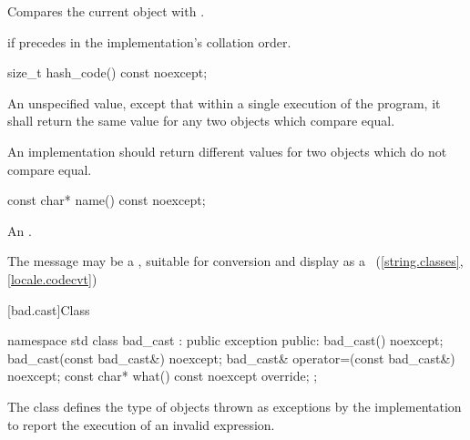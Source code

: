 \begin{itemdescr}
\pnum
\effects
Compares the current object with .

\pnum
\returns
{}
if
precedes  in the implementation's collation order.
\end{itemdescr}

%
\begin{itemdecl}
size_t hash_code() const noexcept;
\end{itemdecl}

\begin{itemdescr}
\pnum
\returns An unspecified value, except that within a single execution of the
program, it shall return the same value for any two 
objects which compare equal.

\pnum
\remarks An implementation should return different values for two
 objects which do not compare equal.
\end{itemdescr}


%
\begin{itemdecl}
const char* name() const noexcept;
\end{itemdecl}

\begin{itemdescr}
\pnum
\returns
An  \ntbs{}.

\pnum
\remarks
The message may be a
,
suitable for conversion and display as a
~(\ref{string.classes}, \ref{locale.codecvt})
\end{itemdescr}

[bad.cast]{Class }

%
\begin{codeblock}
namespace std {
  class bad_cast : public exception {
  public:
    bad_cast() noexcept;
    bad_cast(const bad_cast&) noexcept;
    bad_cast& operator=(const bad_cast&) noexcept;
    const char* what() const noexcept override;
  };
}
\end{codeblock}

\pnum
The class
defines the type of objects thrown
as exceptions by the implementation to report the execution of an invalid
%
expression.

